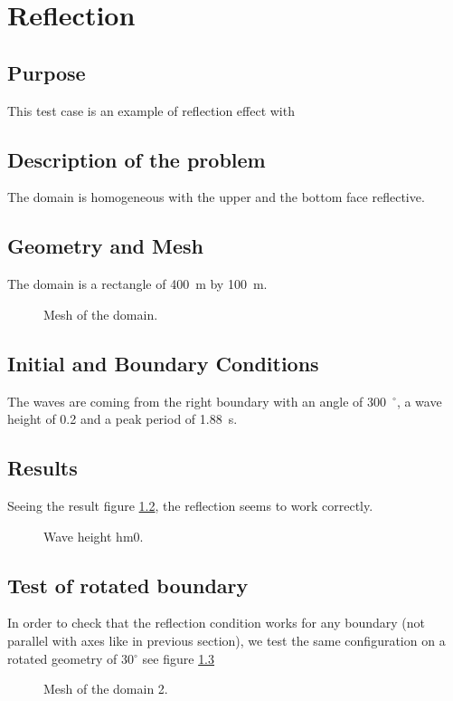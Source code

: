 \chapter{Reflection}
\section{Purpose}
This test case is an example of reflection effect with \tomawac

\section{Description of the problem}
The domain is homogeneous with the upper and the bottom face reflective.  


\section{Geometry and Mesh}
The domain is a rectangle of 400~m by 100~m.

\begin{figure} [!h]
\centering
{}
\caption{Mesh of the domain.}
\label{reflection_mesh}
\end{figure}

\section{Initial and Boundary Conditions}
The waves are coming from the right boundary with an angle of 300~$^{\circ}$, a wave height of 0.2 and a peak period of 1.88~s.

\section{Results}
Seeing the result figure \ref{reflection_result}, the reflection seems to work correctly.
\begin{figure} [!h]
\centering
{}
\caption{Wave height hm0.}
\label{reflection_result}
\end{figure}

\section{Test of rotated boundary}
In order to check that the reflection condition works for any boundary (not parallel with axes like in previous section), we test the same configuration on a rotated geometry of 30$^{\circ}$ see figure \ref{reflection_mesh2}
\begin{figure} [!h]
\centering
{}
\caption{Mesh of the domain 2.}
\label{reflection_mesh2}
\end{figure}

